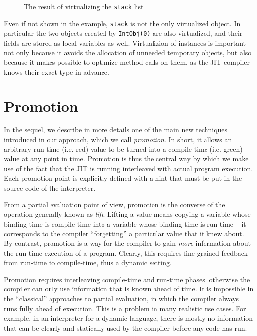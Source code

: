 \begin{figure}[h]
\begin{center}

\caption{The result of virtualizing the \lstinline{stack} list}
\label{fig:tlc-folded-virtualized}
\end{center}
\end{figure}

Even if not shown in the example, \lstinline{stack} is not the only
virtualized object.  In particular the two objects created by
\lstinline{IntObj(0)} are also virtualized, and their fields are stored as
local variables as well.  Virtualizion of instances is important not only
because it avoids the allocation of unneeded temporary objects, but also
because it makes possible to optimize method calls on them, as the JIT
compiler knows their exact type in advance.


\section{Promotion}
\label{sec:promotion}

In the sequel, we describe in more details one of the main new
techniques introduced in our approach, which we call \emph{promotion}.  In
short, it allows an arbitrary run-time (i.e. red) value to be turned into a
compile-time (i.e. green) value at any point in time.  Promotion is thus the central way by
which we make use of the fact that the JIT is running interleaved with actual
program execution. Each promotion point is explicitly defined with a hint that
must be put in the source code of the interpreter.

From a partial evaluation point of view, promotion is the converse of
the operation generally known as \emph{lift}.  Lifting a value means
copying a variable whose binding time is compile-time into a variable
whose binding time is run-time – it corresponds to the compiler
``forgetting'' a particular value that it knew about.  By contrast,
promotion is a way for the compiler to gain \emph{more} information about
the run-time execution of a program. Clearly, this requires
fine-grained feedback from run-time to compile-time, thus a
dynamic setting.

Promotion requires interleaving compile-time and run-time phases,
otherwise the compiler can only use information that is known ahead of
time. It is impossible in the ``classical'' approaches to partial
evaluation, in which the compiler always runs fully ahead of execution.
This is a problem in many realistic use cases.  For example, in an
interpreter for a dynamic language, there is mostly no information
that can be clearly and statically used by the compiler before any
code has run.

